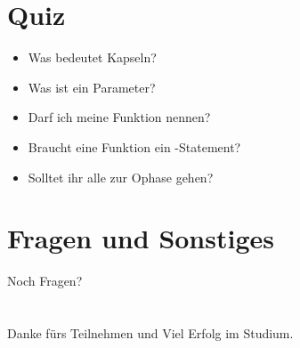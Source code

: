 \livecoding


\subsection{}

\section{Quiz}
\begin{frame}
    \slidehead
    \begin{itemize}
        \item Was bedeutet Kapseln?
            \pause
        \item Was ist ein Parameter?
            \pause
        \item Darf ich meine Funktion  nennen?
            \pause
        \item Braucht eine Funktion ein -Statement?
            \pause
        \item Solltet ihr alle zur Ophase gehen?
    \end{itemize}
\end{frame}

\section{Fragen und Sonstiges}
\begin{frame}
    \slidehead
    \vspace{1.8cm}
    \centering
    \huge Noch Fragen?
\end{frame}

\section{}
\subsection{}

\begin{frame}
    \slidehead
    \vspace{1.8cm}
    \centering
    \huge Danke fürs Teilnehmen und Viel Erfolg im Studium.
\end{frame}


